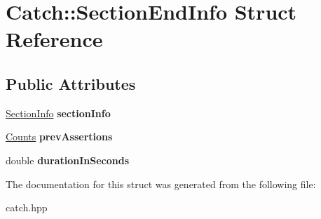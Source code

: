 \hypertarget{struct_catch_1_1_section_end_info}{}\section{Catch\+:\+:Section\+End\+Info Struct Reference}
\label{struct_catch_1_1_section_end_info}
\subsection*{Public Attributes}
\begin{DoxyCompactItemize}
\item 
\mbox{\label{struct_catch_1_1_section_end_info_a2d44793392cb83735d086d726822abe9}} 
\mbox{\hyperlink{struct_catch_1_1_section_info}{Section\+Info}} {\bfseries section\+Info}
\item 
\mbox{\label{struct_catch_1_1_section_end_info_ae70b154cbc05b5dd2901d97f89303d8c}} 
\mbox{\hyperlink{struct_catch_1_1_counts}{Counts}} {\bfseries prev\+Assertions}
\item 
\mbox{\label{struct_catch_1_1_section_end_info_a7c262f2dab9cff166b8eca620c47eea5}} 
double {\bfseries duration\+In\+Seconds}
\end{DoxyCompactItemize}


The documentation for this struct was generated from the following file\+:\begin{DoxyCompactItemize}
\item 
catch.\+hpp\end{DoxyCompactItemize}
